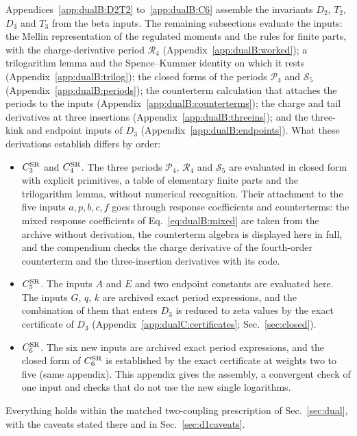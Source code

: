 \documentclass[11pt,a4paper]{article}
\numberwithin{equation}{section}
\newcommand{\CSR}{C^{\rm SR}}
\begin{document}
Appendices~\ref{app:dualB:D2T2} to~\ref{app:dualB:C6} assemble the invariants $D_2$, $T_2$, $D_3$ and $T_3$ from the
beta inputs. The remaining subsections evaluate the inputs: the Mellin representation of the regulated moments and
the rules for finite parts, with the charge-derivative period $\mathcal R_4$ (Appendix~\ref{app:dualB:worked}); a
trilogarithm lemma and the Spence--Kummer identity on which it rests (Appendix~\ref{app:dualB:trilog}); the closed
forms of the periods $\mathcal P_4$ and $\mathcal S_5$ (Appendix~\ref{app:dualB:periods}); the counterterm
calculation that attaches the periods to the inputs (Appendix~\ref{app:dualB:counterterms}); the charge and tail
derivatives at three insertions (Appendix~\ref{app:dualB:threeins}); and the three-kink and endpoint inputs of $D_3$
(Appendix~\ref{app:dualB:endpoints}). What these derivations establish differs by order:
\begin{itemize}
\item $\CSR_3$ and $\CSR_4$. The three periods $\mathcal P_4$, $\mathcal R_4$ and $\mathcal S_5$ are evaluated in closed
 form with explicit primitives, a table of elementary finite parts and the trilogarithm lemma, without numerical
 recognition. Their attachment to the five inputs $a,p,b,c,f$ goes through response coefficients and counterterms:
 the mixed response coefficients of Eq.~\eqref{eq:dualB:mixed} are taken from the archive without derivation, the
 counterterm algebra is displayed here in full, and the compendium checks the charge derivative of the fourth-order
 counterterm and the three-insertion derivatives with its code.
\item $\CSR_5$. The inputs $A$ and $E$ and two endpoint constants are evaluated here. The inputs $G$, $q$, $k$ are
 archived exact period expressions, and the combination of them that enters $D_3$ is reduced to zeta values by the
 exact certificate of $D_3$ (Appendix~\ref{app:dualC:certificates}; Sec.~\ref{sec:closed}).
\item $\CSR_6$. The six new inputs are archived exact period expressions, and the closed form of $\CSR_6$ is
 established by the exact certificate at weights two to five (same appendix). This appendix gives the assembly, a
 convergent check of one input and checks that do not use the new single logarithms.
\end{itemize}
Everything holds within the matched two-coupling prescription of Sec.~\ref{sec:dual}, with the caveats stated there
and in Sec.~\ref{sec:d1caveats}.

\end{document}
